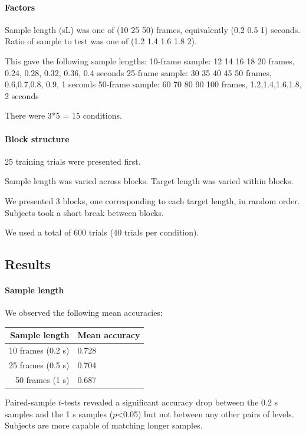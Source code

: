 \paragraph{Factors}

Sample length (sL) was one of (10 25 50) frames, equivalently (0.2 0.5 1) seconds.
Ratio of sample to test was one of (1.2 1.4 1.6 1.8 2).

This gave the following sample lengths:
10-frame sample: 12 14  16 18 20 frames, 0.24, 0.28, 0.32, 0.36, 0.4 seconds
25-frame sample: 30 35 40 45 50 frames, 0.6,0.7,0.8, 0.9, 1 seconds
50-frame sample: 60    70    80    90   100 frames, 1.2,1.4,1.6,1.8,  2 seconds

There were 3*5 = 15 conditions.

\paragraph{Block structure}

25 training trials were presented first.

Sample length was varied across blocks. Target length was varied within blocks.

We presented 3 blocks, one corresponding to each target length, in random order. Subjects took a short break between blocks.

We used a total of 600 trials (40 trials per condition).

\subsection{Results}

\paragraph{Sample length}

We observed the following mean accuracies:

\begin{center}
\begin{tabular}{ r | l   }
\textbf{Sample length} & \textbf{Mean accuracy}\\
\hline
10 frames (0.2 s) & 0.728\\
 25 frames (0.5 s)&  0.704\\
 50 frames (1 s)&  0.687\\
\end{tabular}
\end{center}

Paired-sample $t$-tests revealed a significant accuracy drop between the 0.2 s samples and the 1 s samples ($p$<0.05) but not between any other pairs of levels. Subjects are more capable of matching longer samples.


